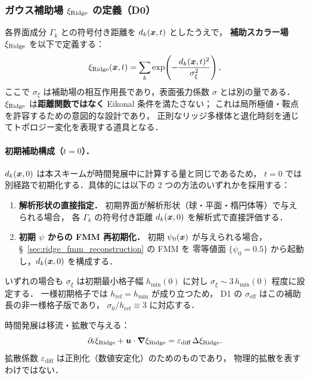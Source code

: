 \subsubsection{ガウス補助場 \texorpdfstring{$\xi_{\text{Ridge}}$}{xi-ridge} の定義（D0）}
\label{sec:ridge_aux_field}

各界面成分 $\Gamma_k$ との符号付き距離を $d_k(\bm{x},t)$ としたうえで，
\textbf{補助スカラー場} $\xi_{\text{Ridge}}$ を以下で定義する：
\begin{equation}
  \xi_{\text{Ridge}}(\bm{x},t) = \sum_k \exp\!\left(-\frac{d_k(\bm{x},t)^2}{\sigma_\xi^2}\right),
\end{equation}
ここで $\sigma_\xi$ は補助場の相互作用長であり，表面張力係数 $\sigma$ とは別の量である．
$\xi_{\text{Ridge}}$ は\textbf{距離関数ではなく}
Eikonal 条件を満たさない；
これは局所極値・鞍点を許容するための意図的な設計であり，
正則なリッジ多様体と退化時刻を通じてトポロジー変化を表現する道具となる．

\paragraph{初期補助構成（$t=0$）．}
$d_k(\bm{x},0)$ は本スキームが時間発展中に計算する量と同じであるため，
$t=0$ では別経路で初期化する．具体的には以下の 2 つの方法のいずれかを採用する：
\begin{enumerate}[leftmargin=1.5em, itemsep=0pt, topsep=2pt]
  \item \textbf{解析形状の直接指定．}
        初期界面が解析形状（球・平面・楕円体等）で与えられる場合，
        各 $\Gamma_k$ の符号付き距離 $d_k(\bm{x},0)$ を解析式で直接評価する．
  \item \textbf{初期 $\psi$ からの FMM 再初期化．}
        初期 $\psi_0(\bm{x})$ が与えられる場合，
        §~\ref{sec:ridge_fmm_reconstruction} の FMM を
        零等値面 $\{\psi_0 = 0.5\}$ から起動し，$d_k(\bm{x},0)$ を構成する．
\end{enumerate}
いずれの場合も $\sigma_\xi$ は初期最小格子幅 $h_\text{min}(0)$ に対し
$\sigma_\xi \sim 3\,h_\text{min}(0)$ 程度に設定する．
一様初期格子では $h_\text{ref} = h_\text{min}$ が成り立つため，
D1 の $\sigma_\text{eff}$ はこの補助長の非一様格子版であり，
$\sigma_0/h_\text{ref} \equiv 3$ に対応する．

時間発展は移流・拡散で与える：
\begin{equation}
  \partial_t \xi_{\text{Ridge}} + \bm{u}\cdot\bm{\nabla}\xi_{\text{Ridge}}
  = \varepsilon_\text{diff}\,\Delta \xi_{\text{Ridge}} .
\end{equation}
拡散係数 $\varepsilon_\text{diff}$ は正則化（数値安定化）のためのものであり，
物理的拡散を表すわけではない．

